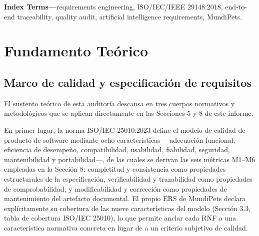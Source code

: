 \documentclass[journal,onecolumn]{IEEEtran}
\begin{document}
\noindent\textbf{Index Terms---}requirements engineering,
ISO/IEC/IEEE 29148:2018, end-to-end traceability, quality audit,
artificial intelligence requirements, MundiPets.



	\newpage
	
	\tableofcontents
	\listoffigures
	\listoftables
	
	\newpage
	
	\section*{Fundamento Teórico}
	\label{sec:fundamento_teorico}
	
	\subsection*{Marco de calidad y especificación de requisitos}
		El sustento teórico de esta auditoría descansa en tres cuerpos normativos y metodológicos que se aplican directamente en las Secciones 5 y 8 de este informe.
	
	En primer lugar, la norma ISO/IEC 25010:2023 \cite{iso25010} define el modelo de calidad de producto de software mediante ocho características ---adecuación funcional, eficiencia de desempeño, compatibilidad, usabilidad, fiabilidad, seguridad, mantenibilidad y portabilidad---, de las cuales se derivan las seis métricas M1--M6 empleadas en la Sección 8: completitud y consistencia como propiedades estructurales de la especificación, verificabilidad y trazabilidad como propiedades de comprobabilidad, y modificabilidad y corrección como propiedades de mantenimiento del artefacto documental. El propio ERS de MundiPets declara explícitamente su cobertura de las nueve características del modelo (Sección 3.3, tabla de cobertura ISO/IEC 25010), lo que permite anclar cada RNF a una característica normativa concreta en lugar de a un criterio subjetivo de calidad.
	
\end{document}
